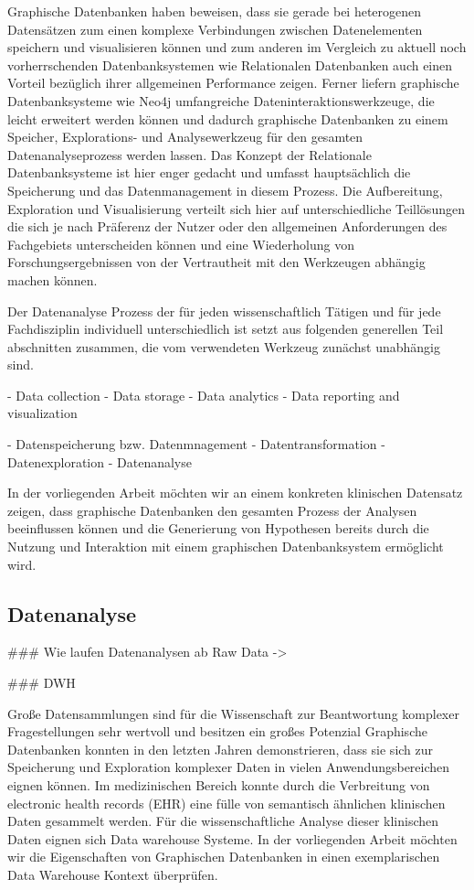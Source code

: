 Graphische Datenbanken haben beweisen, dass sie gerade bei heterogenen Datensätzen zum einen komplexe Verbindungen zwischen Datenelementen speichern und visualisieren können und zum anderen im Vergleich zu aktuell noch vorherrschenden Datenbanksystemen wie Relationalen Datenbanken auch einen Vorteil bezüglich ihrer allgemeinen Performance zeigen. Ferner liefern graphische Datenbanksysteme wie Neo4j umfangreiche Dateninteraktionswerkzeuge, die leicht erweitert werden können und dadurch graphische Datenbanken zu einem Speicher, Explorations- und Analysewerkzeug für den gesamten Datenanalyseprozess werden lassen. Das Konzept der Relationale Datenbanksysteme ist hier enger gedacht und umfasst hauptsächlich die Speicherung und das Datenmanagement in diesem Prozess. Die Aufbereitung, Exploration und Visualisierung verteilt sich hier auf unterschiedliche Teillösungen die sich je nach Präferenz der Nutzer oder den allgemeinen Anforderungen des Fachgebiets unterscheiden können und eine Wiederholung von Forschungsergebnissen von der Vertrautheit mit den Werkzeugen abhängig machen können.  

Der Datenanalyse Prozess der für jeden wissenschaftlich Tätigen und für jede Fachdisziplin individuell unterschiedlich ist setzt aus folgenden generellen Teil abschnitten zusammen, die vom verwendeten Werkzeug zunächst unabhängig sind.  

- Data collection
- Data storage
- Data analytics
- Data reporting and visualization


- Datenspeicherung bzw. Datenmnagement
- Datentransformation
- Datenexploration
- Datenanalyse

In der vorliegenden Arbeit möchten wir an einem konkreten klinischen Datensatz zeigen, dass graphische Datenbanken den gesamten Prozess der Analysen beeinflussen können und die Generierung von Hypothesen bereits durch die Nutzung und Interaktion mit einem graphischen Datenbanksystem ermöglicht wird.


\subsection{Datenanalyse}

### Wie laufen Datenanalysen ab
Raw Data -> 
 
### DWH

Große Datensammlungen sind für die Wissenschaft zur Beantwortung komplexer Fragestellungen sehr wertvoll und besitzen ein großes Potenzial
Graphische Datenbanken konnten in den letzten Jahren demonstrieren, dass sie sich zur Speicherung und Exploration komplexer Daten in vielen Anwendungsbereichen eignen können. Im medizinischen Bereich konnte durch die Verbreitung von electronic health records (EHR) eine fülle von semantisch ähnlichen klinischen Daten gesammelt werden. 
Für die wissenschaftliche Analyse dieser klinischen Daten eignen sich Data warehouse Systeme. In der vorliegenden Arbeit möchten wir die Eigenschaften von Graphischen Datenbanken in einen exemplarischen Data Warehouse Kontext überprüfen.

